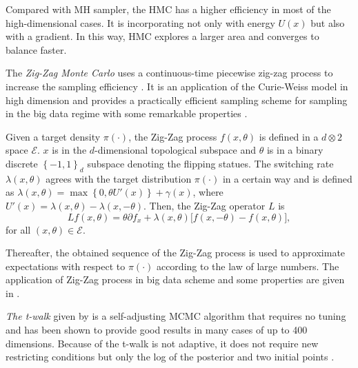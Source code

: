 Compared with MH sampler, the HMC has a higher efficiency in most of the high-dimensional cases. It is incorporating not only with energy $U(x)$ but also with a gradient. In this way, HMC explores a larger area and converges to balance faster. 


The \textit{Zig-Zag Monte Carlo} uses a continuous-time piecewise zig-zag process to increase the sampling efficiency \citep{bierkens2016piecewise}. It is an application of the Curie-Weiss model in high dimension and provides a practically efficient sampling scheme for sampling in the big data regime with some remarkable properties \citep{turitsyn2011irreversible, bierkens2017limit}. 

Given a target density $\pi(\cdot)$, the Zig-Zag process $f(x,\theta)$ is defined in a $d \otimes 2$ space $\mathcal{E}$. $x$ is in the $d$-dimensional topological subspace and $\theta$ is in a binary discrete $\left\lbrace -1,1\right\rbrace_d$ subspace denoting the flipping statues. The switching rate $\lambda(x,\theta)$ agrees with the target distribution $\pi(\cdot)$ in a certain way and is defined as $\lambda(x,\theta) = \max \left\lbrace 0,\theta U'(x) \right\rbrace +\gamma(x)$, where $U'(x)  = \lambda(x,\theta) - \lambda(x,-\theta)$. Then, the Zig-Zag operator $L$ is 
\begin{equation*}
Lf(x,\theta)=\theta\partial f_x+\lambda(x,\theta)\lbrack f(x,-\theta)-f(x,\theta )\rbrack,
\end{equation*}
for all $(x,\theta)\in \mathcal{E}$. 

Thereafter, the obtained sequence of the Zig-Zag process is used to approximate expectations with respect to $\pi(\cdot)$ according to the law of large numbers. 
The application of Zig-Zag process in big data scheme and some properties are given in \citep{bierkens2017limit}. %




\textit{The t-walk} given by \cite{christen2010general} is a self-adjusting MCMC algorithm that requires no tuning and has been shown to provide good results in many cases of up to 400 dimensions. Because of the t-walk is not adaptive, it does not require new restricting conditions but only the log of the posterior and two initial points \citep{blaauw2011flexible}. 

